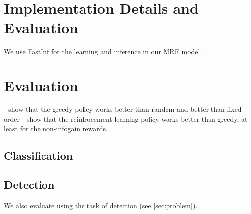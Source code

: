 \documentclass[runningheads]{llncs}
\begin{document}
\section{Implementation Details and Evaluation}
We use FastInf \cite{Jaimovich2010} for the learning and inference in our MRF model.

\section{Evaluation} \label{sec:evaluation}
- show that the greedy policy works better than random and better than fixed-order
- show that the reinfrocement learning policy works better than greedy, at least for the non-infogain rewards.

\subsection{Classification}

\subsection{Detection}
We also evaluate using the task of detection (see \autoref{sec:problem}).




\end{document}
